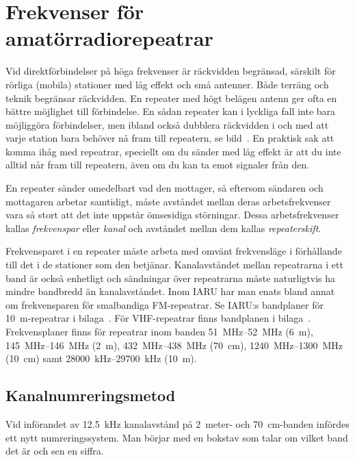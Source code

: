 \chapter[Svenska repeatrar]{Frekvenser för amatörradiorepeatrar}
\label{svenska repeatrar}

\noindent Vid direktförbindelser på höga frekvenser är räckvidden begränsad,
särskilt för rörliga (mobila) stationer med låg effekt och små antenner.
Både terräng och teknik begränsar räckvidden.
En repeater med högt belägen antenn ger ofta en bättre möjlighet till förbindelse.
En sådan repeater kan i lyckliga fall inte bara möjliggöra förbindelser, men
ibland också dubblera räckvidden i och med att varje station bara
behöver nå fram till repeatern, se bild~.
En praktisk sak att komma ihåg med repeatrar, speciellt om du sänder med låg
effekt är att du inte alltid når fram till repeatern, även om du kan ta emot
signaler från den.

En repeater sänder omedelbart vad den mottager, så eftersom sändaren och
mottagaren arbetar samtidigt, måste avståndet mellan deras arbetsfrekvenser vara
så stort att det inte uppstår ömsesidiga störningar.
Dessa arbetsfrekvenser kallas \emph{frekvenspar} eller \emph{kanal} och avståndet
mellan dem kallas \emph{repeaterskift}.

Frekvensparet i en repeater måste arbeta med omvänt frekvensläge i förhållande
till det i de stationer som den betjänar.
Kanalavståndet mellan repeatrarna i ett band är också enhetligt och sändningar
över repeatrarna måste naturligtvis ha mindre bandbredd än kanalavståndet.
Inom IARU har man enats bland annat om frekvensparen för smalbandiga
FM-repeatrar.
Se IARU:s bandplaner för \qty{10}{\metre}-repeatrar i bilaga~.
För VHF-repeatrar finns bandplanen i bilaga~.
Frekvensplaner finns för repeatrar inom banden \SIrange{51}{52}{\mega\hertz}
(\qty{6}{\metre}), \SIrange{145}{146}{\mega\hertz} (\qty{2}{\metre}),
\SIrange{432}{438}{\mega\hertz} (\qty{70}{\centi\metre}),
\SIrange{1240}{1300}{\mega\hertz} (\qty{10}{\centi\metre}) samt
\SIrange{28000}{29700}{\kilo\hertz} (\qty{10}{\metre}).

\section{Kanalnumreringsmetod}
Vid införandet av \qty{12,5}{\kilo\hertz} kanalavstånd på 2~meter- och
\qty{70}{\centi\metre}-banden infördes ett nytt numreringssystem.
Man börjar med en bokstav som talar om vilket band det är och sen en siffra.

